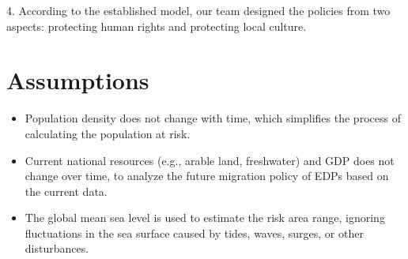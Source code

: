 \documentclass[12pt]{article}  %
\begin{document}
4. According to the established model, our team designed the policies from two aspects: protecting human rights and protecting local culture.


\section{Assumptions}

\begin{itemize}
     \item  
     Population density does not change with time, which simplifies the process of calculating the population at risk.
     
     \item  
     Current national resources (e.g., arable land, freshwater) and GDP does not change over time,  to analyze the future migration policy of EDPs based on the current data.
     
     
     \item  
     The global mean sea level is used to estimate the risk area range, ignoring fluctuations in the sea surface caused by tides, waves, surges, or other disturbances.
\end{itemize}






\newpage
\end{document}
